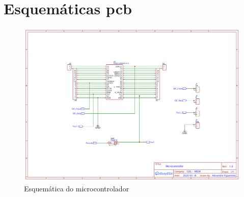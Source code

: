 
\chapter{Esquemáticas \gls{pcb}}
\label{anexo:pcb}

\begin{figure}[H]
  \centering
  \includegraphics[page=1,width=\textwidth,height=\textheight,keepaspectratio]{anexos/esquematica.pdf}
  \caption{Esquemática do microcontrolador}
  \label{fig:esquematica-gps}
\end{figure}

